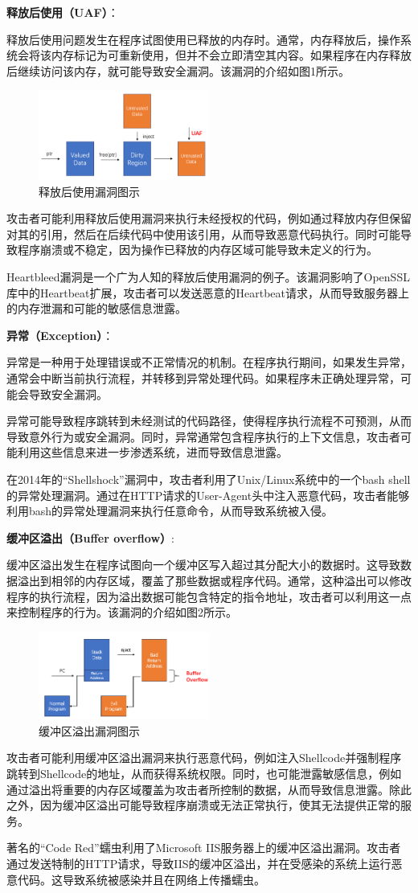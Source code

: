 \textbf{释放后使用（UAF）}：
	
	释放后使用问题发生在程序试图使用已释放的内存时。通常，内存释放后，操作系统会将该内存标记为可重新使用，但并不会立即清空其内容。如果程序在内存释放后继续访问该内存，就可能导致安全漏洞。该漏洞的介绍如图1所示。
	\begin{figure}[htbp]
		\centering
		\includegraphics[width=0.5\textwidth]{pictures/UAF.png}
		\caption{释放后使用漏洞图示}
		\label{fig:UAF}
	\end{figure}
攻击者可能利用释放后使用漏洞来执行未经授权的代码，例如通过释放内存但保留对其的引用，然后在后续代码中使用该引用，从而导致恶意代码执行。同时可能导致程序崩溃或不稳定，因为操作已释放的内存区域可能导致未定义的行为。

Heartbleed漏洞是一个广为人知的释放后使用漏洞的例子。该漏洞影响了OpenSSL库中的Heartbeat扩展，攻击者可以发送恶意的Heartbeat请求，从而导致服务器上的内存泄漏和可能的敏感信息泄露。

\textbf{异常（Exception）}：
	
异常是一种用于处理错误或不正常情况的机制。在程序执行期间，如果发生异常，通常会中断当前执行流程，并转移到异常处理代码。如果程序未正确处理异常，可能会导致安全漏洞。

异常可能导致程序跳转到未经测试的代码路径，使得程序执行流程不可预测，从而导致意外行为或安全漏洞。同时，异常通常包含程序执行的上下文信息，攻击者可能利用这些信息来进一步渗透系统，进而导致信息泄露。

在2014年的``Shellshock''漏洞中，攻击者利用了Unix/Linux系统中的一个bash
shell的异常处理漏洞。通过在HTTP请求的User-Agent头中注入恶意代码，攻击者能够利用bash的异常处理漏洞来执行任意命令，从而导致系统被入侵。
	
\textbf{缓冲区溢出（Buffer overflow）}:
	
缓冲区溢出发生在程序试图向一个缓冲区写入超过其分配大小的数据时。这导致数据溢出到相邻的内存区域，覆盖了那些数据或程序代码。通常，这种溢出可以修改程序的执行流程，因为溢出数据可能包含特定的指令地址，攻击者可以利用这一点来控制程序的行为。该漏洞的介绍如图2所示。
	
\begin{figure}[htbp]
  \centering
  \includegraphics[width=0.5\textwidth]{pictures/Buffer Overflow.png}
  \caption{缓冲区溢出漏洞图示}
  \label{fig:BO}
\end{figure}
	
攻击者可能利用缓冲区溢出漏洞来执行恶意代码，例如注入Shellcode并强制程序跳转到Shellcode的地址，从而获得系统权限。同时，也可能泄露敏感信息，例如通过溢出将重要的内存区域覆盖为攻击者所控制的数据，从而导致信息泄露。除此之外，因为缓冲区溢出可能导致程序崩溃或无法正常执行，使其无法提供正常的服务。

著名的``Code Red''蠕虫利用了Microsoft
IIS服务器上的缓冲区溢出漏洞。攻击者通过发送特制的HTTP请求，导致IIS的缓冲区溢出，并在受感染的系统上运行恶意代码。这导致系统被感染并且在网络上传播蠕虫。
	